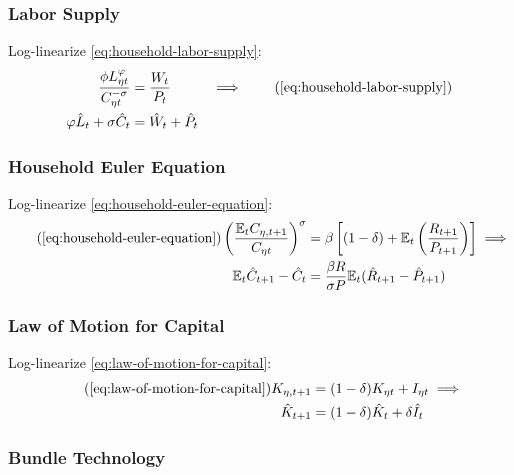 \documentclass[
	12pt,
	]{article}
\numberwithin{equation}{section}
\newcommand{\E}[1][t]{{\mathbb{E}_{#1}}}
\theoremstyle{definition}
\theoremstyle{plain}
\theoremstyle{plain}
\theoremstyle{plain}
\begin{document}

\subsubsection{Labor Supply}

Log-linearize \ref{eq:household-labor-supply}:
\begin{alignat}{2}
	\frac{\phi L_{\eta t}^{\varphi}}{C_{\eta t}^{-\sigma}} &= \frac{W_t}{P_t} & \implies \tag{\ref{eq:household-labor-supply}} \\
	\varphi \hat{L}_t + \sigma \hat{C}_t &= \hat{W}_t + \hat{P}_t & \label{eq:ll-labor-supply}
\end{alignat}


\subsubsection{Household Euler Equation}

Log-linearize \ref{eq:household-euler-equation}:
\begin{align}
	\tag{\ref{eq:household-euler-equation}}
	\left( \frac{\mathbb{E}_t C_{\eta, t+1}}{C_{\eta t}} \right)^\sigma &= \beta \left[ (1-\delta) + \mathbb{E}_t \left(\frac{R_{t+1}}{P_{t+1}}\right) \right] \implies \\
	\label{eq:ll-household-euler-equation}
	\E \hat{C}_{t+1} - \hat{C}_t &= \frac{\beta R}{\sigma P} \E(\hat{R}_{t+1} - \hat{P}_{t+1})
\end{align}


\subsubsection{Law of Motion for Capital}

Log-linearize \ref{eq:law-of-motion-for-capital}:
\begin{align}
	\tag{\ref{eq:law-of-motion-for-capital}}
	K_{\eta, t+1} &= (1-\delta)K_{\eta t} + I_{\eta t} \implies \\
	\label{eq:ll-law-of-motion-for-capital}
	\hat{K}_{t+1} &= (1-\delta)\hat{K}_t + \delta \hat{I}_t
\end{align}


\subsubsection{Bundle Technology}
\end{document}
